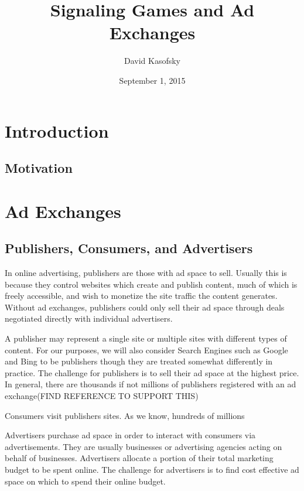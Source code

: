 \documentclass{article}
\title{Signaling Games and Ad Exchanges}
\author{David Kasofsky}
\date{September 1, 2015}
\begin{document}
\maketitle

\newpage

\tableofcontents

\newpage

\section{Introduction}

\subsection{Motivation}

\newpage

\section{Ad Exchanges}

\subsection{Publishers, Consumers, and Advertisers}

In online advertising, publishers are those with ad space to sell. Usually this is because they control websites which create and publish content, much of which is freely accessible, and wish to monetize the site traffic the content generates. Without ad exchanges, publishers could only sell their ad space through deals negotiated directly with individual advertisers. 

A publisher may represent a single site or multiple sites with different types of content. For our purposes, we will also consider Search Engines such as Google and Bing to be publishers though they are treated somewhat differently in practice. The challenge for publishers is to sell their ad space at the highest price. In general, there are thousands if not millions of publishers registered with an ad exchange(FIND REFERENCE TO SUPPORT THIS)

Consumers visit publishers sites. As we know, hundreds of millions 

Advertisers purchase ad space in order to interact with consumers via advertisements. They are usually businesses or advertising agencies acting on behalf of businesses. Advertisers allocate a portion of their total marketing budget to be spent online. The challenge for advertisers is to find cost effective ad space on which to spend their online budget. 
\end{document}

